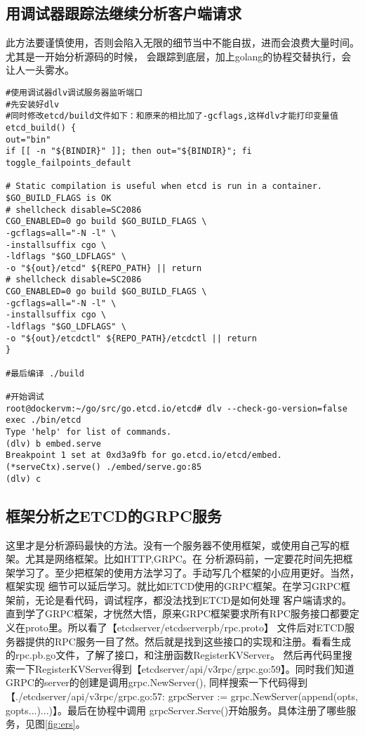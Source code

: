 \subsection{用调试器跟踪法继续分析客户端请求}
此方法要谨慎使用，否则会陷入无限的细节当中不能自拔，进而会浪费大量时间。尤其是一开始分析源码的时候，
会跟踪到底层，加上golang的协程交替执行，会让人一头雾水。
\begin{verbatim}
#使用调试器dlv调试服务器监听端口
#先安装好dlv
#同时修改etcd/build文件如下：和原来的相比加了-gcflags,这样dlv才能打印变量值
etcd_build() {
out="bin"
if [[ -n "${BINDIR}" ]]; then out="${BINDIR}"; fi
toggle_failpoints_default

# Static compilation is useful when etcd is run in a container. $GO_BUILD_FLAGS is OK
# shellcheck disable=SC2086
CGO_ENABLED=0 go build $GO_BUILD_FLAGS \
-gcflags=all="-N -l" \
-installsuffix cgo \
-ldflags "$GO_LDFLAGS" \
-o "${out}/etcd" ${REPO_PATH} || return
# shellcheck disable=SC2086
CGO_ENABLED=0 go build $GO_BUILD_FLAGS \
-gcflags=all="-N -l" \
-installsuffix cgo \
-ldflags "$GO_LDFLAGS" \
-o "${out}/etcdctl" ${REPO_PATH}/etcdctl || return
}

#最后编译 ./build

#开始调试
root@dockervm:~/go/src/go.etcd.io/etcd# dlv --check-go-version=false exec ./bin/etcd
Type 'help' for list of commands.
(dlv) b embed.serve
Breakpoint 1 set at 0xd3a9fb for go.etcd.io/etcd/embed.(*serveCtx).serve() ./embed/serve.go:85
(dlv) c

\end{verbatim}

\subsection{框架分析之ETCD的GRPC服务}
这里才是分析源码最快的方法。没有一个服务器不使用框架，或使用自己写的框架。尤其是网络框架。比如HTTP,GRPC。在
分析源码前，一定要花时间先把框架学习了。至少把框架的使用方法学习了。手动写几个框架的小应用更好。当然，框架实现
细节可以延后学习。就比如ETCD使用的GRPC框架。在学习GRPC框架前，无论是看代码，调试程序，都没法找到ETCD是如何处理
客户端请求的。直到学了GRPC框架，才恍然大悟，原来GRPC框架要求所有RPC服务接口都要定义在proto里。所以看了【etcdserver/etcdserverpb/rpc.proto】
文件后对ETCD服务器提供的RPC服务一目了然。然后就是找到这些接口的实现和注册。看看生成的rpc.pb.go文件，了解了接口，和注册函数RegisterKVServer。
然后再代码里搜索一下RegisterKVServer得到【etcdserver/api/v3rpc/grpc.go:59】。同时我们知道GRPC的server的创建是调用grpc.NewServer(),
同样搜索一下代码得到【./etcdserver/api/v3rpc/grpc.go:57:      grpcServer := grpc.NewServer(append(opts, gopts...)...)】。最后在协程中调用
grpcServer.Serve()开始服务。具体注册了哪些服务，见图\ref{fig:ers}。

